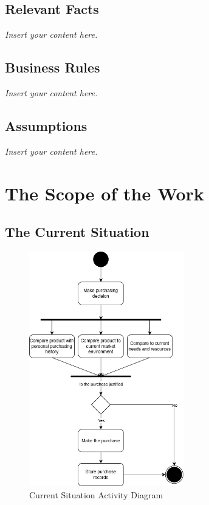 \documentclass[12pt]{article}
\newcommand{\lips}{\textit{Insert your content here.}}
\begin{document}
\subsection{Relevant Facts}
\lips
\subsection{Business Rules}
\lips
\subsection{Assumptions}
\lips

\section{The Scope of the Work}
\subsection{The Current Situation}
\begin{figure}[H]
    \centering
    \includegraphics[width=0.6\textwidth]{currentsituation}
    \caption{Current Situation Activity Diagram}
    \label{fig:currentsituation}
\end{figure}
\end{document}
